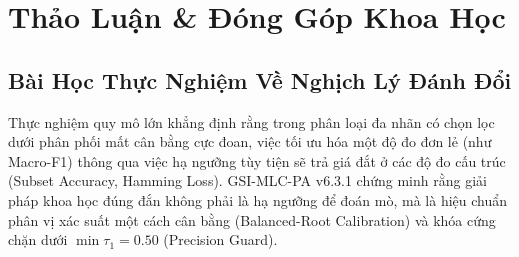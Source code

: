 \documentclass[10pt,a4paper,twoside]{article}
\begin{document}
\section{Thảo Luận \& Đóng Góp Khoa Học}
\subsection{Bài Học Thực Nghiệm Về Nghịch Lý Đánh Đổi}
Thực nghiệm quy mô lớn khẳng định rằng trong phân loại đa nhãn có chọn lọc dưới phân phối mất cân bằng cực đoan, việc tối ưu hóa một độ đo đơn lẻ (như Macro-F1) thông qua việc hạ ngưỡng tùy tiện sẽ trả giá đắt ở các độ đo cấu trúc (Subset Accuracy, Hamming Loss). GSI-MLC-PA v6.3.1 chứng minh rằng giải pháp khoa học đúng đắn không phải là hạ ngưỡng để đoán mò, mà là hiệu chuẩn phân vị xác suất một cách cân bằng (Balanced-Root Calibration) và khóa cứng chặn dưới $\min \tau_1 = 0.50$ (Precision Guard).
\end{document}
